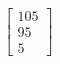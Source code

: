\documentclass[preview]{standalone}
\begin{document}
\begin{align*}
\begin{bmatrix}105\\95\\5\end{bmatrix}
\end{align*}
\end{document}
